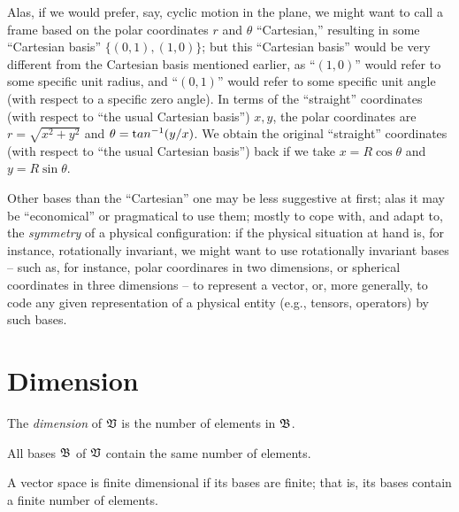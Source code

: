 Alas, if we would prefer, say, cyclic motion in the plane,
we might want to call a frame based on the polar coordinates $r$ and $\theta$ ``Cartesian,''
resulting in some ``Cartesian basis'' $\{(0,1),(1,0)\}$;
but this ``Cartesian basis'' would be very different from the Cartesian
basis mentioned earlier,
as ``$(1,0)$'' would refer to some specific unit radius,
and ``$(0,1)$'' would refer to some specific unit angle (with respect to a specific zero angle).
In terms of the ``straight'' coordinates (with respect to ``the usual Cartesian basis'')
$x,y$, the polar coordinates are $r = \sqrt{x^2+y^2}$ and $\theta = {\textrm tan}^{-1} (y/x)$.
We obtain the original ``straight'' coordinates (with respect to ``the usual Cartesian basis'')
back if we take
$x=R\cos \theta$
and
$y=R\sin \theta$.

Other bases than the ``Cartesian'' one may be less suggestive at first; alas it may be ``economical'' or pragmatical to use them;
mostly to cope with, and adapt to, the {\em symmetry} of a physical configuration:
if the physical situation at hand is, for instance, rotationally invariant,
we might want to use rotationally invariant bases --
such as, for instance, polar coordinares in two dimensions, or spherical coordinates in three dimensions --
to represent a vector, or, more generally, to code any given representation of a physical entity
(e.g., tensors, operators) by such bases.


\section{Dimension}
The {\em dimension}
of $\frak V$ is the number of elements in $\frak B$.

All bases $\frak B$ of $\frak V$ contain the same number of elements.

A vector space is finite dimensional if its bases are finite; that is, its bases
contain a finite number of elements.

